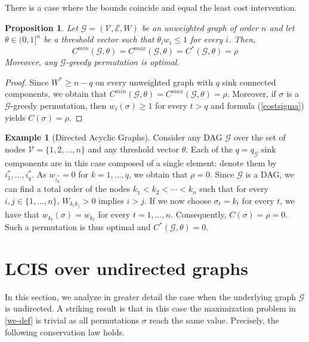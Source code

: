 \documentclass[12pt,twoside,reqno]{amsart}
\newtheorem{proposition}[theorem]{Proposition}
\theoremstyle{definition}
\newtheorem{example}[theorem]{Example}
\numberwithin{equation}{section}
\newcommand{\be}{\begin{equation}}
\newcommand{\ee}{\end{equation}}
\newcommand{\mc}{\mathcal}
\newcommand{\0}{\mathbf{0}}
\newcommand{\1}{\mathbf{1}}
\newcommand{\thre}{\theta}
\newcommand{\threabs}{\theta}
\newcommand{\we}{W^*}
\begin{document}
{There is a case where the bounds coincide and equal the least cost intervention. 
\begin{proposition}\label{prop:special} Let $\mc G=(\mc V, \mc E, W)$ be an unweighted graph of order $n$ and let $\threabs\in (0,1]^n$ be a threshold vector such that $\thre_iw_i\leq 1$ for every $i$. Then,
\be\label{conn}C^{min}(\mc G,\threabs)=C^{max}(\mc G,\threabs)= C^*(\mc G, \threabs)=\rho\ee
Moreover, any $\mc G$-greedy permutation is optimal.
%
\end{proposition}
\begin{proof} 
Since $\we\geq n-q$ on every unweighted graph with $q$ sink connected components, we obtain that $C^{min}(\mc G,\threabs)=C^{max}(\mc G,\threabs)=\rho$. Moreover, if $\sigma$ is a $\mc G$-greedy permutation, then $w_t(\sigma)\geq 1$ for every $t>q$ and formula (\ref{costsigma}) yields $C(\sigma)=\rho$.
\end{proof}

\begin{example}[Directed Acyclic Graphs]\label{ex:DAG} Consider any DAG $\mc G$ over the set of nodes $\mc V=\{1,2,\dots , n\}$ and any threshold vector $\theta$. Each of the  $q=q_{\mc G}$ sink components are in this case composed of a single element: denote them by $i^*_1, \dots , i^*_q$. As $w_{i^*_k}=0$ for $k=1,\dots, q$, we obtain that $\rho=0$. %
Since $\mc G$ is a DAG,  we can find a total order of the nodes $k_1<k_2<\cdots <k_n$ such that for every $i, j\in\{1,\dots , n\}$, $W_{k_ik_j}>0$ implies $i>j$. If we now choose $\sigma_t=k_t$ for every $t$, we have that $w_{k_t}(\sigma)=w_{k_t}$ for every $t=1,\dots ,n$. Consequently, $C(\sigma)=\rho=0$. Such a permutation is thus optimal and $C^*(\mc G, \threabs)=0$.
\end{example}%


\section{LCIS over undirected graphs}
In this section, we analyze in greater detail the case when the underlying graph $\mc G$ is undirected. A striking result is that in this case the maximization problem in \eqref{we-def} is trivial as all permutations $\sigma$ reach the same value. Precisely, the following conservation law holds.

}
\end{document}
